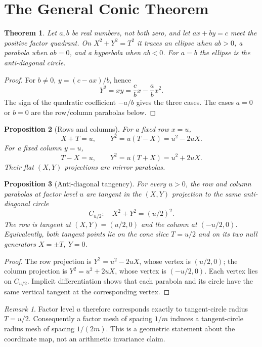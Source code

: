 \documentclass[11pt]{amsart}
\newtheorem{theorem}{Theorem}[section]
\newtheorem{proposition}[theorem]{Proposition}
\theoremstyle{remark}
\newtheorem*{remark}{Remark}
\begin{document}
\section{The General Conic Theorem}
\begin{theorem}\label{thm:conic}
Let $a,b$ be real numbers, not both zero, and let $ax+by=c$ meet the positive factor quadrant. On $X^2+Y^2=T^2$ it traces an ellipse when $ab>0$, a parabola when $ab=0$, and a hyperbola when $ab<0$. For $a=b$ the ellipse is the anti-diagonal circle.
\end{theorem}
\begin{proof}
For $b\ne0$, $y=(c-ax)/b$, hence
\[
Y^2=xy=\frac cbx-\frac abx^2.
\]
The sign of the quadratic coefficient $-a/b$ gives the three cases. The cases $a=0$ or $b=0$ are the row/column parabolas below.
\end{proof}

\begin{proposition}[Rows and columns]\label{prop:rows}
For a fixed row $x=u$,
\[
X+T=u,\qquad Y^2=u(T-X)=u^2-2uX.
\]
For a fixed column $y=u$,
\[
T-X=u,\qquad Y^2=u(T+X)=u^2+2uX.
\]
Their flat $(X,Y)$ projections are mirror parabolas.
\end{proposition}

\begin{proposition}[Anti-diagonal tangency]\label{prop:tangent}
For every $u>0$, the row and column parabolas at factor level $u$ are tangent in the $(X,Y)$ projection to the same anti-diagonal circle
\[
C_{u/2}:\quad X^2+Y^2=(u/2)^2.
\]
The row is tangent at $(X,Y)=(u/2,0)$ and the column at $(-u/2,0)$. Equivalently, both tangent points lie on the cone slice $T=u/2$ and on its two null generators $X=\pm T$, $Y=0$.
\end{proposition}
\begin{proof}
The row projection is $Y^2=u^2-2uX$, whose vertex is $(u/2,0)$; the column projection is $Y^2=u^2+2uX$, whose vertex is $(-u/2,0)$. Each vertex lies on $C_{u/2}$. Implicit differentiation shows that each parabola and its circle have the same vertical tangent at the corresponding vertex.
\end{proof}

\begin{remark}
Factor level $u$ therefore corresponds exactly to tangent-circle radius $T=u/2$. Consequently a factor mesh of spacing $1/m$ induces a tangent-circle radius mesh of spacing $1/(2m)$. This is a geometric statement about the coordinate map, not an arithmetic invariance claim.
\end{remark}
\end{document}
